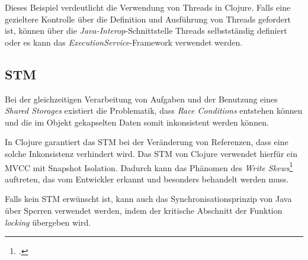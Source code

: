 Dieses Beispiel verdeutlicht die Verwendung von Threads in Clojure. Falls eine gezieltere Kontrolle über die Definition und Ausführung von Threads gefordert ist, können über die \textit{Java-Interop}-Schnittstelle Threads selbstständig definiert oder es kann das \textit{ExecutionService}-Framework verwendet werden.

\subsection*{\acl{STM}}
Bei der gleichzeitigen Verarbeitung von Aufgaben und der Benutzung eines \textit{Shared Storages} existiert die Problematik, dass \textit{Race Conditions} entstehen können und die im Objekt gekapselten Daten somit inkonsistent werden können.

In Clojure garantiert das \acf{STM} bei der Veränderung von Referenzen, dass eine solche Inkonsistenz verhindert wird. Das \acs{STM} von Clojure verwendet hierfür ein \ac{MVCC} mit Snapshot Isolation. Dadurch kann das Phänomen des \textit{Write Skews}\footcite[S. Seite 17]{RENZSTATE} auftreten, das vom Entwickler erkannt und besonders behandelt werden muss.

Falls kein \ac{STM} erwünscht ist, kann auch das Synchronisationsprinzip von Java über Sperren verwendet werden, indem der kritische Abschnitt der Funktion \textit{locking} übergeben wird.
